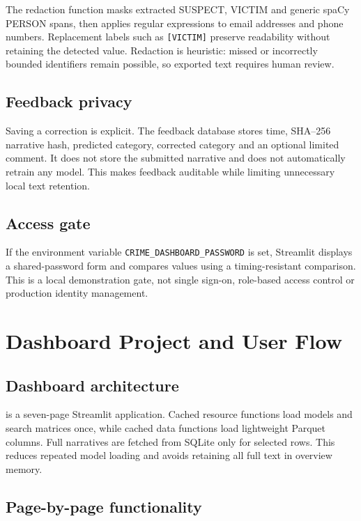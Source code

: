 \documentclass[12pt,a4paper]{report}
\newcommand{\code}[1]{\texttt{#1}}
\begin{document}
The redaction function masks extracted SUSPECT, VICTIM and generic spaCy PERSON spans, then applies regular expressions to email addresses and phone numbers. Replacement labels such as \code{[VICTIM]} preserve readability without retaining the detected value. Redaction is heuristic: missed or incorrectly bounded identifiers remain possible, so exported text requires human review.

\section{Feedback privacy}

Saving a correction is explicit. The feedback database stores time, SHA--256 narrative hash, predicted category, corrected category and an optional limited comment. It does not store the submitted narrative and does not automatically retrain any model. This makes feedback auditable while limiting unnecessary local text retention.

\section{Access gate}

If the environment variable \code{CRIME\_DASHBOARD\_PASSWORD} is set, Streamlit displays a shared-password form and compares values using a timing-resistant comparison. This is a local demonstration gate, not single sign-on, role-based access control or production identity management.

\chapter{Dashboard Project and User Flow}

\section{Dashboard architecture}

 is a seven-page Streamlit application. Cached resource functions load models and search matrices once, while cached data functions load lightweight Parquet columns. Full narratives are fetched from SQLite only for selected rows. This reduces repeated model loading and avoids retaining all full text in overview memory.

\section{Page-by-page functionality}
\end{document}
